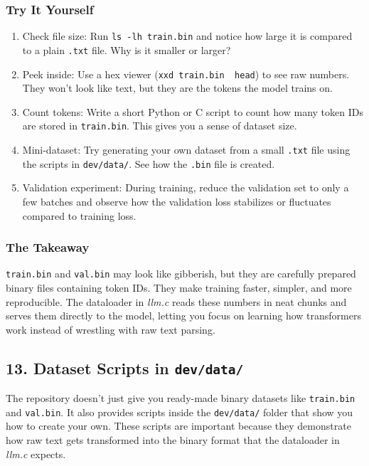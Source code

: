 \documentclass[
  letterpaper,
  DIV=11,
  numbers=noendperiod]{scrreprt}
\providecommand{\tightlist}{%
  \setlength{\itemsep}{0pt}\setlength{\parskip}{0pt}}
\begin{document}
\subsubsection{Try It Yourself}\label{try-it-yourself-1}

\begin{enumerate}
\def\labelenumi{\arabic{enumi}.}
\tightlist
\item
  Check file size: Run \texttt{ls\ -lh\ train.bin} and notice how large
  it is compared to a plain \texttt{.txt} file. Why is it smaller or
  larger?
\item
  Peek inside: Use a hex viewer
  (\texttt{xxd\ train.bin\ \textbar{}\ head}) to see raw numbers. They
  won't look like text, but they are the tokens the model trains on.
\item
  Count tokens: Write a short Python or C script to count how many token
  IDs are stored in \texttt{train.bin}. This gives you a sense of
  dataset size.
\item
  Mini-dataset: Try generating your own dataset from a small
  \texttt{.txt} file using the scripts in \texttt{dev/data/}. See how
  the \texttt{.bin} file is created.
\item
  Validation experiment: During training, reduce the validation set to
  only a few batches and observe how the validation loss stabilizes or
  fluctuates compared to training loss.
\end{enumerate}

\subsubsection{The Takeaway}\label{the-takeaway-1}

\texttt{train.bin} and \texttt{val.bin} may look like gibberish, but
they are carefully prepared binary files containing token IDs. They make
training faster, simpler, and more reproducible. The dataloader in
\emph{llm.c} reads these numbers in neat chunks and serves them directly
to the model, letting you focus on learning how transformers work
instead of wrestling with raw text parsing.

\subsection{\texorpdfstring{13. Dataset Scripts in
\texttt{dev/data/}}{13. Dataset Scripts in dev/data/}}\label{dataset-scripts-in-devdata}

The repository doesn't just give you ready-made binary datasets like
\texttt{train.bin} and \texttt{val.bin}. It also provides scripts inside
the \texttt{dev/data/} folder that show you how to create your own.
These scripts are important because they demonstrate how raw text gets
transformed into the binary format that the dataloader in \emph{llm.c}
expects.
\end{document}
